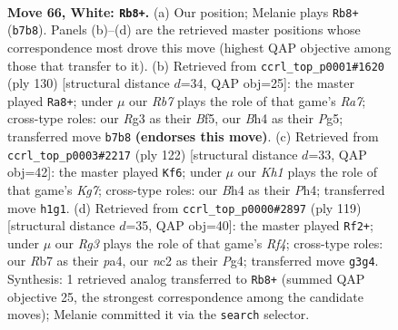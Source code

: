 \documentclass[11pt]{article}
\begin{document}
\clearpage

\begin{figure}[p]\centering
\begin{subfigure}{0.46\textwidth}\centering
\resizebox{\linewidth}{!}{%
\newchessgame
\chessboard[
  setfen={7k/1R6/7r/8/r5bB/6R1/2n2P2/7K w - - 11 66},
  showmover=false,
  pgfstyle=straightmove, color=movearrow, markmove={b7-b8}
]}
\caption{}
\end{subfigure}\hfill
\begin{subfigure}{0.46\textwidth}\centering
\resizebox{\linewidth}{!}{%
\newchessgame
\chessboard[
  setfen={7k/R7/1p6/1Pb2BPr/8/8/3K4/8 w - - 1 66},
  showmover=false,
  pgfstyle=straightmove, color=movearrow, markmove={a7-a8}
]}
\caption{}
\end{subfigure}
\\[4pt]
\begin{subfigure}{0.46\textwidth}\centering
\resizebox{\linewidth}{!}{%
\newchessgame
\chessboard[
  setfen={8/6K1/8/3k2B1/4b1rP/4R3/8/8 w - - 17 62},
  showmover=false,
  pgfstyle=straightmove, color=movearrow, markmove={g7-f6}
]}
\caption{}
\end{subfigure}\hfill
\begin{subfigure}{0.46\textwidth}\centering
\resizebox{\linewidth}{!}{%
\newchessgame
\chessboard[
  setfen={8/5B2/7k/R1b2r2/P5p1/6P1/4K3/8 b - - 0 60},
  showmover=false,
  pgfstyle=straightmove, color=movearrow, markmove={f5-f2}
]}
\caption{}
\end{subfigure}
\caption{\textbf{Move 66, White: \texttt{Rb8+}.} (a) Our position; Melanie plays \texttt{Rb8+} (\texttt{b7b8}). Panels (b)--(d) are the retrieved master positions whose correspondence most drove this move (highest QAP objective among those that transfer to it). (b) Retrieved from \texttt{ccrl\_top\_p0001\#1620} (ply 130) [structural distance $d$=34, QAP obj=25]: the master played \texttt{Ra8+}; under $\mu$ our \emph{Rb7} plays the role of that game's \emph{Ra7}; cross-type roles: our \emph{R}g3 as their \emph{B}f5, our \emph{B}h4 as their \emph{P}g5; transferred move \texttt{b7b8} \textbf{(endorses this move)}. (c) Retrieved from \texttt{ccrl\_top\_p0003\#2217} (ply 122) [structural distance $d$=33, QAP obj=42]: the master played \texttt{Kf6}; under $\mu$ our \emph{Kh1} plays the role of that game's \emph{Kg7}; cross-type roles: our \emph{B}h4 as their \emph{P}h4; transferred move \texttt{h1g1}. (d) Retrieved from \texttt{ccrl\_top\_p0000\#2897} (ply 119) [structural distance $d$=35, QAP obj=40]: the master played \texttt{Rf2+}; under $\mu$ our \emph{Rg3} plays the role of that game's \emph{Rf4}; cross-type roles: our \emph{R}b7 as their \emph{p}a4, our \emph{n}c2 as their \emph{P}g4; transferred move \texttt{g3g4}. Synthesis: 1 retrieved analog transferred to \texttt{Rb8+} (summed QAP objective 25, the strongest correspondence among the candidate moves); Melanie committed it via the \texttt{search} selector.}
\label{fig:thought-m130}
\end{figure}
\end{document}
